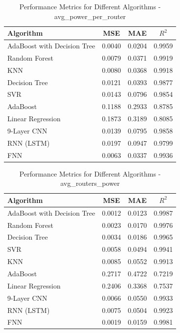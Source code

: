 \documentclass[conference]{IEEEtran}
\begin{document}
\begin{table}[htbp]
	\caption{Performance Metrics for Different Algorithms - avg\_power\_per\_router}
	\label{tab:avg_power_per_router}
	\begin{tabular}{lccc}
		\toprule
		\textbf{Algorithm} & \textbf{MSE} & \textbf{MAE} & \textbf{\(R^2\)} \\
		\midrule
		AdaBoost with Decision Tree & 0.0040 & 0.0204 & 0.9959 \\
		Random Forest & 0.0079 & 0.0371 & 0.9919 \\
		KNN & 0.0080 & 0.0368 & 0.9918 \\
		Decision Tree & 0.0121 & 0.0393 & 0.9877 \\
		SVR & 0.0143 & 0.0796 & 0.9854 \\
		AdaBoost & 0.1188 & 0.2933 & 0.8785 \\
		Linear Regression & 0.1873 & 0.3189 & 0.8085 \\
		9-Layer CNN                & 0.0139       & 0.0795       & 0.9858      \\ 
		RNN (LSTM)  & 0.0197       & 0.0947       & 0.9799      \\ 
		FNN                & 0.0063       & 0.0337       & 0.9936      \\ 
		\bottomrule
	\end{tabular}
\end{table}

\begin{table}[htbp]
	\caption{Performance Metrics for Different Algorithms - avg\_routers\_power}
	\label{tab:avg_routers_power}
	\begin{tabular}{lccc}
		\toprule
		\textbf{Algorithm} & \textbf{MSE} & \textbf{MAE} & \textbf{\(R^2\)} \\
		\midrule
		AdaBoost with Decision Tree & 0.0012 & 0.0123 & 0.9987 \\
		Random Forest & 0.0023 & 0.0170 & 0.9976 \\
		Decision Tree & 0.0034 & 0.0186 & 0.9965 \\
		SVR & 0.0058 & 0.0494 & 0.9941 \\
		KNN & 0.0085 & 0.0552 & 0.9913 \\
		AdaBoost & 0.2717 & 0.4722 & 0.7219 \\
		Linear Regression & 0.2406 & 0.3368 & 0.7537 \\
		9-Layer CNN                & 0.0066       & 0.0550       & 0.9933      \\ 
		RNN (LSTM)  & 0.0075       & 0.0504       & 0.9923      \\ 
		FNN                & 0.0019       & 0.0159       & 0.9981      \\ 
		\bottomrule
	\end{tabular}
\end{table}
\end{document}

